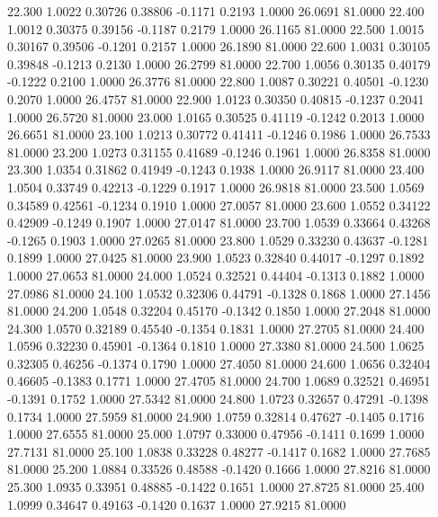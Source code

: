   22.300   1.0022   0.30726   0.38806  -0.1171   0.2193   1.0000  26.0691  81.0000
  22.400   1.0012   0.30375   0.39156  -0.1187   0.2179   1.0000  26.1165  81.0000
  22.500   1.0015   0.30167   0.39506  -0.1201   0.2157   1.0000  26.1890  81.0000
  22.600   1.0031   0.30105   0.39848  -0.1213   0.2130   1.0000  26.2799  81.0000
  22.700   1.0056   0.30135   0.40179  -0.1222   0.2100   1.0000  26.3776  81.0000
  22.800   1.0087   0.30221   0.40501  -0.1230   0.2070   1.0000  26.4757  81.0000
  22.900   1.0123   0.30350   0.40815  -0.1237   0.2041   1.0000  26.5720  81.0000
  23.000   1.0165   0.30525   0.41119  -0.1242   0.2013   1.0000  26.6651  81.0000
  23.100   1.0213   0.30772   0.41411  -0.1246   0.1986   1.0000  26.7533  81.0000
  23.200   1.0273   0.31155   0.41689  -0.1246   0.1961   1.0000  26.8358  81.0000
  23.300   1.0354   0.31862   0.41949  -0.1243   0.1938   1.0000  26.9117  81.0000
  23.400   1.0504   0.33749   0.42213  -0.1229   0.1917   1.0000  26.9818  81.0000
  23.500   1.0569   0.34589   0.42561  -0.1234   0.1910   1.0000  27.0057  81.0000
  23.600   1.0552   0.34122   0.42909  -0.1249   0.1907   1.0000  27.0147  81.0000
  23.700   1.0539   0.33664   0.43268  -0.1265   0.1903   1.0000  27.0265  81.0000
  23.800   1.0529   0.33230   0.43637  -0.1281   0.1899   1.0000  27.0425  81.0000
  23.900   1.0523   0.32840   0.44017  -0.1297   0.1892   1.0000  27.0653  81.0000
  24.000   1.0524   0.32521   0.44404  -0.1313   0.1882   1.0000  27.0986  81.0000
  24.100   1.0532   0.32306   0.44791  -0.1328   0.1868   1.0000  27.1456  81.0000
  24.200   1.0548   0.32204   0.45170  -0.1342   0.1850   1.0000  27.2048  81.0000
  24.300   1.0570   0.32189   0.45540  -0.1354   0.1831   1.0000  27.2705  81.0000
  24.400   1.0596   0.32230   0.45901  -0.1364   0.1810   1.0000  27.3380  81.0000
  24.500   1.0625   0.32305   0.46256  -0.1374   0.1790   1.0000  27.4050  81.0000
  24.600   1.0656   0.32404   0.46605  -0.1383   0.1771   1.0000  27.4705  81.0000
  24.700   1.0689   0.32521   0.46951  -0.1391   0.1752   1.0000  27.5342  81.0000
  24.800   1.0723   0.32657   0.47291  -0.1398   0.1734   1.0000  27.5959  81.0000
  24.900   1.0759   0.32814   0.47627  -0.1405   0.1716   1.0000  27.6555  81.0000
  25.000   1.0797   0.33000   0.47956  -0.1411   0.1699   1.0000  27.7131  81.0000
  25.100   1.0838   0.33228   0.48277  -0.1417   0.1682   1.0000  27.7685  81.0000
  25.200   1.0884   0.33526   0.48588  -0.1420   0.1666   1.0000  27.8216  81.0000
  25.300   1.0935   0.33951   0.48885  -0.1422   0.1651   1.0000  27.8725  81.0000
  25.400   1.0999   0.34647   0.49163  -0.1420   0.1637   1.0000  27.9215  81.0000
